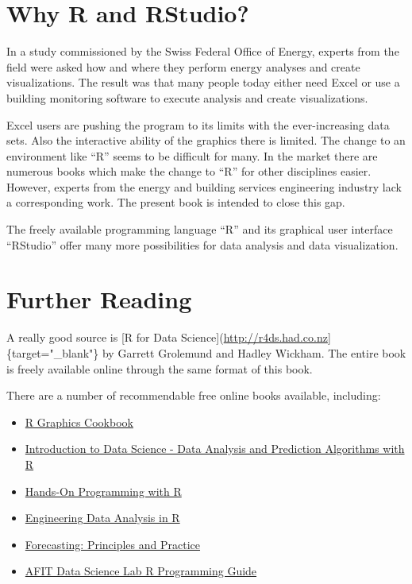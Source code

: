 \documentclass[
]{book}
\providecommand{\tightlist}{%
  \setlength{\itemsep}{0pt}\setlength{\parskip}{0pt}}
\begin{document}
\hypertarget{why-r-and-rstudio}{%
\section{Why R and RStudio?}\label{why-r-and-rstudio}}

In a study commissioned by the Swiss Federal Office of Energy, experts from the field were asked how and where they perform energy analyses and create visualizations. The result was that many people today either need Excel or use a building monitoring software to execute analysis and create visualizations.

Excel users are pushing the program to its limits with the ever-increasing data sets. Also the interactive ability of the graphics there is limited. The change to an environment like ``R'' seems to be difficult for many. In the market there are numerous books which make the change to ``R'' for other disciplines easier. However, experts from the energy and building services engineering industry lack a corresponding work. The present book is intended to close this gap.

The freely available programming language ``R'' and its graphical user interface ``RStudio'' offer many more possibilities for data analysis and data visualization.

\hypertarget{further-reading}{%
\section{Further Reading}\label{further-reading}}

A really good source is {[}R for Data Science{]}(\url{http://r4ds.had.co.nz}{]}\{target="\_blank"\} by Garrett Grolemund and Hadley Wickham. The entire book is freely available online through the same format of this book.

There are a number of recommendable free online books available, including:

\begin{itemize}
\tightlist
\item
  \href{https://r-graphics.org/}{R Graphics Cookbook}
\item
  \href{https://rafalab.github.io/dsbook/}{Introduction to Data Science - Data Analysis and Prediction Algorithms with R}
\item
  \href{https://rstudio-education.github.io/hopr/}{Hands-On Programming with R}
\item
  \href{https://smogdr.github.io/edar_coursebook/}{Engineering Data Analysis in R}
\item
  \href{https://otexts.com/fpp2/}{Forecasting: Principles and Practice}
\item
  \href{https://afit-r.github.io/}{AFIT Data Science Lab R Programming Guide}
\end{itemize}
\end{document}
